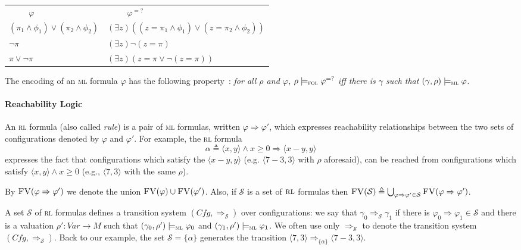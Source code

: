 \documentclass[conference]{IEEEtran}
\newcommand{\Cfg}{\mathit{Cfg}}
\newcommand{\M}{\mathit{M}}
\newcommand{\eqbydef}{\triangleq}
\renewcommand{\S}{\mathcal{S}}
\newcommand{\tran}[2]{\Ra^{\!#1}_{\!#2}}
\newcommand{\Ra}{\Rightarrow}
\newcommand{\Var}{\mathit{Var}}
\newcommand{\FreeVars}{\mathit{\textsc{FV}}}
\newcommand{\ML}{\textsc{ml}\xspace}
\newcommand{\FOL}{\textsc{fol}\xspace}
\newcommand{\RL}{\textsc{rl}\xspace}
\newcommand{\rrule}[2]{{#1} \Ra{#2}}
\newcommand{\modelsml}{\models_\ML}
\newcommand{\modelsfol}{\models_\FOL}
\begin{document}
\hspace*{-4ex}
\begin{tabular}{ll}
$\hspace{1cm}\varphi$ & $\hspace{1cm}\varphi^{=?}$\\[1ex]
$(\pi_1\land \phi_1)\lor(\pi_2\land\phi_2)$ & $(\exists z) ((z=\pi_1\land \phi_1)\lor(z=\pi_2\land\phi_2))$\\
$\neg\pi$ & $(\exists z)\neg(z=\pi)$\\
$\pi\lor\neg\pi $ & $(\exists z)(z=\pi\lor \neg(z=\pi))$\\[2ex]
\end{tabular}

\noindent
The encoding of an \ML formula $\varphi$ has the following property~\cite{lucanu-rusu-arusoaie-nowak-LRC2015}: \emph{for all $\rho$ and $\varphi$, $\rho \modelsfol \varphi^{=?}$ iff there is $\gamma$ such that $(\gamma, \rho) \modelsml \varphi$}.


\paragraph{Reachability Logic}
An \RL formula (also called \emph{rule}) is a pair of \ML formulas, written $\rrule{\varphi}{\varphi'}$, which expresses reachability relationships between the two sets of configurations denoted by $\varphi$ and $\varphi'$.
For example, the \RL formula
$$\alpha \eqbydef \rrule{\langle x , y \rangle \land x \geq 0}{\langle x - y, y \rangle}$$
\noindent
expresses the fact that configurations which satisfy the $\langle x - y, y \rangle$ (e.g.  $\langle 7 - 3, 3\rangle$ with $\rho$ aforesaid), can be reached from configurations which satisfy $\langle x , y \rangle \land x \geq 0$ (e.g., $\langle 7, 3\rangle$ with the same $\rho$).

By $\FreeVars(\rrule{\varphi}{\varphi'})$ we denote the union $\FreeVars(\varphi) \cup \FreeVars(\varphi')$. 
Also, if $\S$ is a set of $\RL$ formulas then $\FreeVars(\S) \eqbydef \bigcup_{\rrule{\varphi}{\varphi'} \in \S} \FreeVars(\rrule{\varphi}{\varphi'})$.

A set $\S$ of \RL formulas defines a transition system $(\Cfg, \tran{}{\S})$ over configurations: we say that $\gamma_0 \tran{}{\S} \gamma_1$ if there is $\rrule{\varphi_0}{\varphi_1} \in \S$ and there is a valuation $\rho':\Var \to \M$ such that $(\gamma_0, \rho') \modelsml \varphi_0$ and $(\gamma_1, \rho') \modelsml \varphi_1$. 
We often use only $\tran{}{\S}$ to denote the transition system $(\Cfg, \tran{}{\S})$.
Back to our example, the set $\S = \{ \alpha \}$ generates the transition $\langle 7, 3\rangle \tran{}{\{\alpha\}} \langle 7 - 3, 3\rangle$. 
\end{document}
